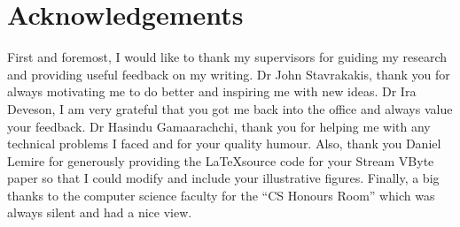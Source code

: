 \chapter*{Acknowledgements}

First and foremost, I would like to thank my supervisors for guiding my research
and providing useful feedback on my writing.
Dr John Stavrakakis, thank you for always motivating me to do better and
inspiring me with new ideas.
Dr Ira Deveson, I am very grateful that you got me back into the office and
always value your feedback.
Dr Hasindu Gamaarachchi, thank you for helping me with any technical problems I
faced and for your quality humour. Also, thank you Daniel Lemire for generously
providing the \LaTeX source code for your Stream VByte paper \cite{svb} so that
I could modify and include your illustrative figures. Finally, a big thanks to
the computer science faculty for the ``CS Honours Room'' which was
always silent and had a nice view.
